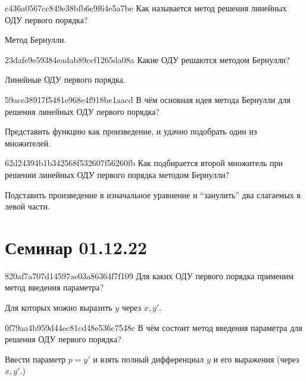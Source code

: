 \begin{note}{c436a0567cc849e38bfb6e9f64e5a7be}
    Как называется метод решения линейных ОДУ первого порядка?

    \begin{cloze}{1}
        Метод Бернулли.
    \end{cloze}
\end{note}

\begin{note}{23dafe9e59384eadab89ccf1265da08a}
    Какие ОДУ решаются методом Бернулли?

    \begin{cloze}{1}
        Линейные ОДУ первого порядка.
    \end{cloze}
\end{note}

\begin{note}{59ace38917f5481e968e4f918be1aacd}
     В чём основная идея метода Бернулли для решения линейных ОДУ первого порядка?

     \begin{cloze}{1}
         Представить функцию как произведение, и удачно подобрать один из множителей.
     \end{cloze}
\end{note}

\begin{note}{62d24394b1b342568f532607f56260fb}
    Как подбирается второй множитель при решении линейных ОДУ первого порядка методом Бернулли?

    \begin{cloze}{1}
        Подставить произведение в изначальное уравнение и ``занулить'' два слагаемых в левой части.
    \end{cloze}
\end{note}

\section{Семинар 01.12.22}
\begin{note}{820af7a707d14597ae03a86364f7f109}
    Для каких ОДУ первого порядка применим метод введения параметра?

    \begin{cloze}{1}
        Для которых можно выразить \({ y }\) через \({ x, y' }\).
    \end{cloze}
\end{note}

\begin{note}{0f79aa4b959d44ec81cd48e536c7548c}
    В чём состоит метод введения параметра для решения ОДУ первого порядка?

    \begin{cloze}{1}
        Ввести параметр \({ p = y' }\) и взять полный дифференциал \({ y }\) и его выражения (через \({ x, y' }\).)
    \end{cloze}
\end{note}

